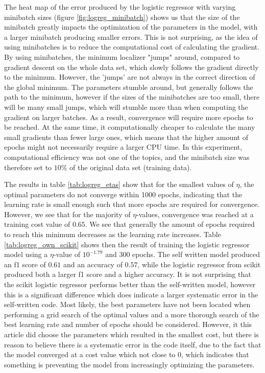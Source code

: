\documentclass[a4paper,10pt,english]{article}
\begin{document}
The heat map of the error produced by the logistic regressor with varying minibatch sizes (figure \ref{fig:logreg_minibatch}) shows us that the size of the minibatch greatly impacts the optimization of the parameters in the model, with a larger minibatch producing smaller errors. This is not surprising, as the idea of using minibatches is to reduce the computational cost of calculating the gradient. By using minibatches, the minimum localizer "jumps" around, compared to gradient descent on the whole data set, which slowly follows the gradient directly to the minimum. However, the 'jumps' are not always in the correct direction of the global minimum. The parameters stumble around, but generally follows the path to the minimum, however if the sizes of the minibatches are too small, there will be many small jumps, which will stumble more than when computing the gradient on larger batches. As a result, convergence will require more epochs to be reached. At the same time, it computationally cheaper to calculate the many small gradients than fewer large ones, which means that the higher amount of epochs might not necessarily require a larger CPU time. In this experiment, computational efficiency was not one of the topics, and the minibatch size was therefore set to $10\%$ of the original data set (training data).

The results in table \ref{tab:logreg_etas} show that for the smallest values of $\eta$, the optimal parameters do not converge within 1000 epochs, indicating that the learning rate is small enough such that more epochs are required for convergence. However, we see that for the majority of $\eta$-values, convergence was reached at a training cost value of $0.65$. We see that generally the amount of epochs required to reach this minimum decreases as the learning rate increases. Table \ref{tab:logreg_own_scikit} shows then the result of training the logistic regressor model using a $\eta$-value of $10^{-1.79}$ and 300 epochs. The self written model produced an f1 score of $0.61$ and an accuracy of $0.57$, while the logistic regressor from scikit produced both a larger f1 score and a higher accuracy. It is not surprising that the scikit logistic regressor performs better than the self-written model, however this is a significant difference which does indicate a larger systematic error in the self-written code. Most likely, the best parameters have not been located when performing a grid search of the optimal values and a more thorough search of the best learning rate and number of epochs should be considered. However, it this article did choose the parameters which resulted in the smallest cost, but there is reason to believe there is a systematic error in the code itself, due to the fact that the model converged at a cost value which not close to $0$, which indicates that something is preventing the model from increasingly optimizing the parameters. 
\end{document}
